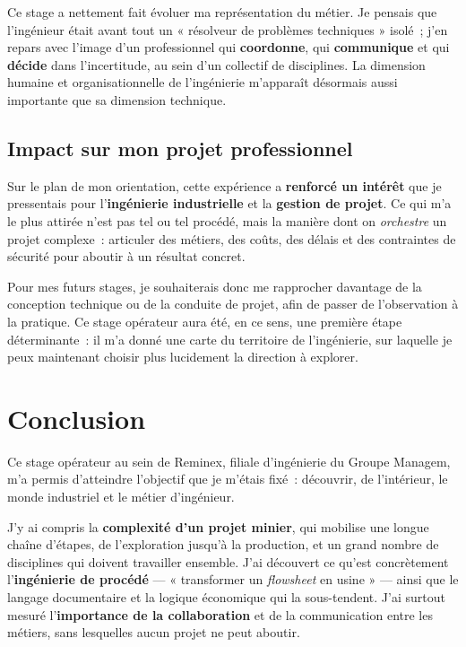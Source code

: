 \documentclass[12pt,a4paper,oneside]{report}
\begin{document}
Ce stage a nettement fait évoluer ma représentation du métier. Je pensais que l'ingénieur était avant tout un « résolveur de problèmes techniques » isolé~; j'en repars avec l'image d'un professionnel qui \textbf{coordonne}, qui \textbf{communique} et qui \textbf{décide} dans l'incertitude, au sein d'un collectif de disciplines. La dimension humaine et organisationnelle de l'ingénierie m'apparaît désormais aussi importante que sa dimension technique.

\section{Impact sur mon projet professionnel}

Sur le plan de mon orientation, cette expérience a \textbf{renforcé un intérêt} que je pressentais pour l'\textbf{ingénierie industrielle} et la \textbf{gestion de projet}. Ce qui m'a le plus attirée n'est pas tel ou tel procédé, mais la manière dont on \emph{orchestre} un projet complexe~: articuler des métiers, des coûts, des délais et des contraintes de sécurité pour aboutir à un résultat concret.

Pour mes futurs stages, je souhaiterais donc me rapprocher davantage de la conception technique ou de la conduite de projet, afin de passer de l'observation à la pratique. Ce stage opérateur aura été, en ce sens, une première étape déterminante~: il m'a donné une carte du territoire de l'ingénierie, sur laquelle je peux maintenant choisir plus lucidement la direction à explorer.
\chapter*{Conclusion}

Ce stage opérateur au sein de Reminex, filiale d'ingénierie du Groupe Managem, m'a permis d'atteindre l'objectif que je m'étais fixé~: découvrir, de l'intérieur, le monde industriel et le métier d'ingénieur.

J'y ai compris la \textbf{complexité d'un projet minier}, qui mobilise une longue chaîne d'étapes, de l'exploration jusqu'à la production, et un grand nombre de disciplines qui doivent travailler ensemble. J'ai découvert ce qu'est concrètement l'\textbf{ingénierie de procédé} --- « transformer un \textit{flowsheet} en usine » --- ainsi que le langage documentaire et la logique économique qui la sous-tendent. J'ai surtout mesuré l'\textbf{importance de la collaboration} et de la communication entre les métiers, sans lesquelles aucun projet ne peut aboutir.
\end{document}
